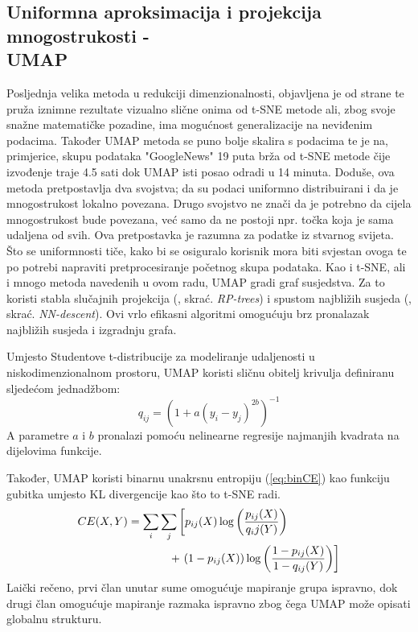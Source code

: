 \documentclass[times, utf8, diplomski]{fer}
\begin{document}
\subsection{Uniformna aproksimacija i projekcija mnogostrukosti -\\ UMAP}

Posljednja velika metoda u redukciji dimenzionalnosti, objavljena je od strane \cite{mcinnes2018umap} te pruža iznimne rezultate vizualno slične onima od t-SNE metode ali, zbog svoje snažne matematičke pozadine, ima mogućnost generalizacije na neviđenim podacima. Također UMAP metoda se puno bolje skalira s podacima te je na, primjerice, skupu podataka "GoogleNews" 19 puta brža od t-SNE metode čije izvođenje traje 4.5 sati dok UMAP isti posao odradi u 14 minuta. Doduše, ova metoda pretpostavlja dva svojstva; da su podaci uniformno distribuirani i da je mnogostrukost lokalno povezana. Drugo svojstvo ne znači da je potrebno da cijela mnogostrukost bude povezana, već samo da ne postoji npr. točka koja je sama udaljena od svih. Ova pretpostavka je razumna za podatke iz stvarnog svijeta. Što se uniformnosti tiče, kako bi se osiguralo korisnik mora biti svjestan ovoga te po potrebi napraviti pretprocesiranje početnog skupa podataka. Kao i t-SNE, ali i mnogo metoda navedenih u ovom radu, UMAP gradi graf susjedstva. Za to koristi stabla slučajnih projekcija (, skrać. \emph{RP-trees}) i spustom najbližih susjeda (, skrać. \emph{NN-descent}). Ovi vrlo efikasni algoritmi omogućuju brz pronalazak najbližih susjeda i izgradnju grafa.

Umjesto Studentove t-distribucije za modeliranje udaljenosti u niskodimenzionalnom prostoru, UMAP koristi sličnu obitelj krivulja definiranu sljedećom jednadžbom:
\begin{equation}
    q_{ij} = (1 + a(y_i - y_j)^{2b})^{-1}
\end{equation}
A parametre $a$ i $b$ pronalazi pomoću nelinearne regresije najmanjih kvadrata na dijelovima funkcije.

Također, UMAP koristi binarnu unakrsnu entropiju (\ref{eq:binCE}) kao funkciju gubitka umjesto KL divergencije kao što to t-SNE radi.
\begin{align}
    CE(X, Y) & = \sum_i \sum_j \left[ p_{ij}(X) \log \left( \frac{p_{ij}(X)}{q_ij(Y)} \right)
    \right. \nonumber                                                                         \\ &\hphantom{ \sum_i \sum_j \big[} + \left.
        ( 1 - p_{ij}(X)) \log \left(\frac{1 - p_{ij}(X)}{1 - q_{ij}(Y)}\right) \right]
    \label{eq:binCE}
\end{align}
Laički rečeno, prvi član unutar sume omogućuje mapiranje grupa ispravno, dok drugi član omogućuje mapiranje razmaka ispravno zbog čega  UMAP može opisati globalnu strukturu.
\end{document}
